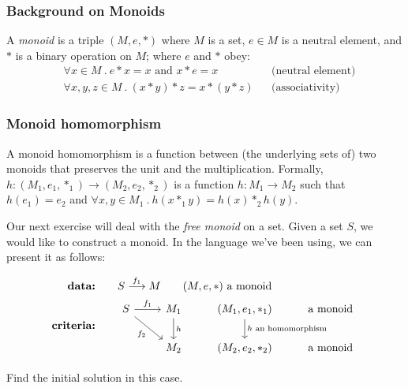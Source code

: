 \subsubsection*{Background on Monoids}

A \emph{monoid} is a triple $(M, e, \ast)$ where $M$ is a set, $e \in M$ is a
neutral element, and $\ast$ is a binary operation on $M$; where $e$ and $\ast$
obey:
\begin{align*}
    & \forall x \in M\ .\
    e \ast x = x \text{ and } x \ast e = x && \text{(neutral
    element)} \\
    & \forall x,y,z \in M\ .\
    (x \ast y) \ast z = x \ast (y \ast z) && \text{(associativity)}
\end{align*}

\subsubsection*{Monoid homomorphism}

A monoid homomorphism is a function between (the underlying sets of) two
monoids that preserves the unit and the multiplication. Formally,
$h : (M_1, e_1, \ast_1) \rightarrow (M_2, e_2, \ast_2)$ is a function
$h: M_1\to M_2$ such that $h(e_1) = e_2$ and
$\forall x, y \in M_1\ .\ h(x \ast_1 y) = h(x) \ast_2 h(y)$.

Our next exercise will deal with the \emph{free monoid} on a set.
Given a set $S$, we would like to construct a monoid. In the language we've
been using, we can present it as follows:

\begin{align*}
    \textbf{data:}\qquad& S \overset{f_1}{\longrightarrow}M
    \qquad \text{$(M,e,\ast)$ a monoid}\\
    \textbf{criteria:}\qquad& \begin{tikzcd}[ampersand replacement=\&]
        S \arrow[r, "f_1"] \arrow[dr, swap, "f_2"] \&
        M_1
        \arrow[d, "h"]
        \& (M_1,e_1,\ast_1)
        \arrow[d, "\text{$h$ an homomorphism}"]
        \& \text{a monoid}
        \\
        {}
        \& M_2 \& (M_2,e_2,\ast_2) \& \text{a monoid}
    \end{tikzcd}
\end{align*}

\begin{exercise}
    Find the initial solution in this case.
\end{exercise}



